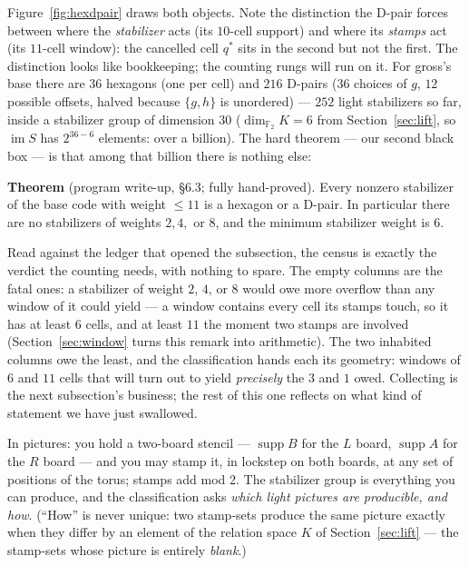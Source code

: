 \documentclass[11pt]{article}
\theoremstyle{plain}
\theoremstyle{definition}
\theoremstyle{remark}
\newcommand{\F}{\mathbb{F}}
\newcommand{\suppop}{\operatorname{supp}}
\begin{document}
Figure~\ref{fig:hexdpair} draws both objects. Note the distinction the
D-pair forces between where the \emph{stabilizer} acts (its $10$-cell
support) and where its \emph{stamps} act (its $11$-cell window): the
cancelled cell $q^*$ sits in the second but not the first. The distinction
looks like bookkeeping; the counting rungs will run on it. For gross's base
there are $36$ hexagons (one per cell) and $216$ D-pairs ($36$ choices of
$g$, $12$ possible offsets, halved because $\{g,h\}$ is unordered) ---
$252$ light stabilizers so far, inside a stabilizer group of dimension $30$
($\dim_{\F_2} K = 6$ from Section~\ref{sec:lift}, so $\operatorname{im} S$
has $2^{36-6}$ elements: over a billion). The hard theorem --- our second
black box --- is that among that billion there is nothing else:

\begin{inputbox}
\textbf{Theorem} (program write-up, \S6.3; fully hand-proved). Every nonzero
stabilizer of the base code with weight $\leq 11$ is a hexagon or a D-pair. In
particular there are no stabilizers of weights $2, 4,$ or $8$, and the minimum
stabilizer weight is $6$.
\end{inputbox}

Read against the ledger that opened the subsection, the census is exactly
the verdict the counting needs, with nothing to spare. The empty columns
are the fatal ones: a stabilizer of weight $2$, $4$, or $8$ would owe more
overflow than any window of it could yield --- a window contains every cell
its stamps touch, so it has at least $6$ cells, and at least $11$ the
moment two stamps are involved (Section~\ref{sec:window} turns this remark
into arithmetic). The two inhabited columns owe the least, and the
classification hands each its geometry: windows of $6$ and $11$ cells that
will turn out to yield \emph{precisely} the $3$ and $1$ owed. Collecting is
the next subsection's business; the rest of this one reflects on what kind
of statement we have just swallowed.

In pictures: you hold a two-board stencil --- $\suppop B$ for the $L$
board, $\suppop A$ for the $R$ board --- and you may stamp it, in lockstep
on both boards, at any set of positions of the torus; stamps add mod 2. The
stabilizer group is everything you can produce, and the classification asks
\emph{which light pictures are producible, and how}. (``How'' is never
unique: two stamp-sets produce the same picture exactly when they differ by
an element of the relation space $K$ of Section~\ref{sec:lift} --- the
stamp-sets whose picture is entirely \emph{blank}.)
\end{document}
